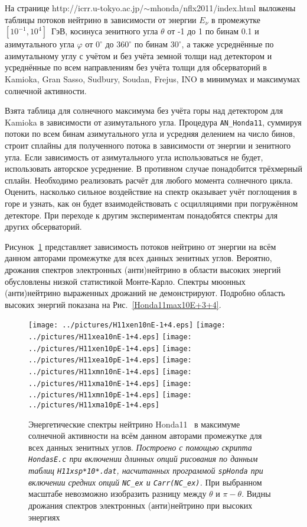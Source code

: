 На странице http://icrr.u-tokyo.ac.jp/$\sim$mhonda/nflx2011/index.html выложены таблицы потоков нейтрино в зависимости от энергии $E_{\nu}$ в промежутке $[10^{-1},10^{4}]$~ГэВ, косинуса зенитного угла $\theta$ от -1 до 1 по бинам 0.1 и азимутального угла $\varphi$ от $0^{\circ}$ до $360^{\circ}$ по бинам $30^{\circ}$, а также усреднённые по азимутальному углу с учётом и без учёта земной толщи над детектором и усреднённые по всем направлениям без учёта толщи для обсерваторий в Kamioka, Gran Sasso, Sudbury, Soudan, Frejus, INO в минимумах и максимумах солнечной активности.

\newpage
{\color{blue}Взята таблица для солнечного максимума без учёта горы над детектором для Kamioka в зависимости от азимутального угла.} Процедура \texttt{AN\_Honda11}, суммируя потоки по всем бинам азимутального угла и усредняя делением на число бинов, строит сплайны для полученного потока в зависимости от энергии и зенитного угла. {\color{MYgreen}Если зависимость от азимутального угла использоваться не будет, использовать авторское усреднение. В противном случае понадобится трёхмерный сплайн. Необходимо реализовать расчёт для любого момента солнечного цикла. Оценить, насколько сильное воздействие на спектр оказывает учёт {\color{red}поглощения в горе} и {\color{red}узнать}, как он будет взаимодействовать с осцилляциями при {\color{red}погружённом детекторе}. При переходе к другим экспериментам понадобятся спектры для других обсерваторий.}

Рисунок~\ref{Honda11max10E-1+4} представляет зависимость потоков нейтрино от энергии на всём данном авторами промежутке для всех данных зенитных углов. Вероятно, дрожания спектров электронных (анти)нейтрино в области высоких энергий обусловлены низкой статистикой Монте-Карло. Спектры мюонных (анти)нейтрино выраженных дрожаний не демонстрируют. Подробно область высоких энергий показана на Рис.~\ref{Honda11max10E+3+4}.
\begin{figure}[!ht]
\texttt{[image: ../pictures/H11xen10nE-1+4.eps]}
\texttt{[image: ../pictures/H11xea10nE-1+4.eps]}
\texttt{[image: ../pictures/H11xen10pE-1+4.eps]}
\texttt{[image: ../pictures/H11xea10pE-1+4.eps]}
\texttt{[image: ../pictures/H11xmn10nE-1+4.eps]}
\texttt{[image: ../pictures/H11xma10nE-1+4.eps]}
\texttt{[image: ../pictures/H11xmn10pE-1+4.eps]}
\texttt{[image: ../pictures/H11xma10pE-1+4.eps]}
\caption{Энергетические спектры нейтрино Honda11~\cite{Honda:2011nf} в максимуме солнечной активности на всём данном авторами промежутке для всех данных зенитных углов. \textit{Построено с помощью скрипта \texttt{HondasE.c} при включении длинных опций рисования по данным таблиц \texttt{H11xsp*10*.dat}, насчитанных программой \texttt{spHonda} при включении средних опций \texttt{NC\_ex} и \texttt{Carr(NC\_ex)}.} При выбранном масштабе невозможно изобразить разницу между $\theta$ и $\pi-\theta$. Видны дрожания спектров электронных (анти)нейтрино при высоких энергиях}
\label{Honda11max10E-1+4}
\end{figure}

